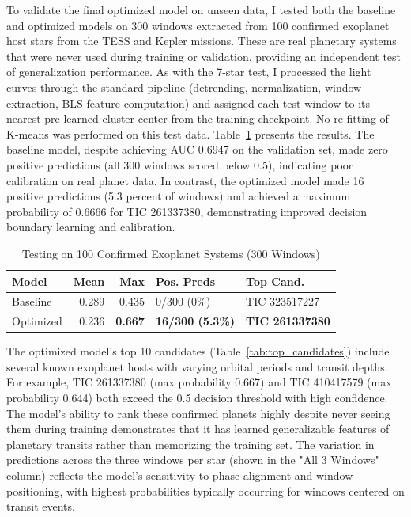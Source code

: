 \documentclass[letterpaper]{article} %
\begin{document}
To validate the final optimized model on unseen data, I tested both the baseline and optimized models on 300 windows extracted from 100 confirmed exoplanet host stars from the TESS and Kepler missions. These are real planetary systems that were never used during training or validation, providing an independent test of generalization performance. As with the 7-star test, I processed the light curves through the standard pipeline (detrending, normalization, window extraction, BLS feature computation) and assigned each test window to its nearest pre-learned cluster center from the training checkpoint. No re-fitting of K-means was performed on this test data. Table~\ref{tab:planet_test_results} presents the results. The baseline model, despite achieving AUC 0.6947 on the validation set, made zero positive predictions (all 300 windows scored below 0.5), indicating poor calibration on real planet data. In contrast, the optimized model made 16 positive predictions (5.3 percent of windows) and achieved a maximum probability of 0.6666 for TIC 261337380, demonstrating improved decision boundary learning and calibration.

\begin{table}[h]
    \centering
    \small
    \caption{Testing on 100 Confirmed Exoplanet Systems (300 Windows)}
    \label{tab:planet_test_results}
    \begin{tabular}{@{}lrrp{1.3cm}p{1.5cm}@{}}
        \toprule
        \textbf{Model} & \textbf{Mean} & \textbf{Max} & \textbf{Pos. Preds} & \textbf{Top Cand.} \\
        \midrule
            Baseline & 0.289 & 0.435 & 0/300 (0\%) & TIC 323517227 \\
            Optimized & 0.236 & \textbf{0.667} & \textbf{16/300 (5.3\%)} & \textbf{TIC 261337380} \\
        \bottomrule
    \end{tabular}
\end{table}

The optimized model's top 10 candidates (Table~\ref{tab:top_candidates}) include several known exoplanet hosts with varying orbital periods and transit depths. For example, TIC 261337380 (max probability 0.667) and TIC 410417579 (max probability 0.644) both exceed the 0.5 decision threshold with high confidence. The model's ability to rank these confirmed planets highly despite never seeing them during training demonstrates that it has learned generalizable features of planetary transits rather than memorizing the training set. The variation in predictions across the three windows per star (shown in the "All 3 Windows" column) reflects the model's sensitivity to phase alignment and window positioning, with highest probabilities typically occurring for windows centered on transit events.
\end{document}

